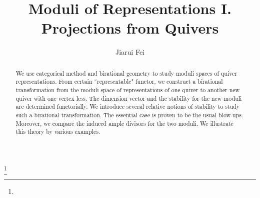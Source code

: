 \documentclass{amsart}
\theoremstyle{definition}
\theoremstyle{remark}
\numberwithin{equation}{section}
\begin{document}
\title{Moduli of Representations I. Projections from Quivers}

\author{Jiarui Fei}
\address{Department of Mathematics, University of Michigan, Ann Arbor, MI 48109, USA}
\thanks{}


\date{}
\dedicatory{}

\begin{abstract} We use categorical method and birational geometry to study moduli spaces of quiver representations. From certain ``representable" functor, we construct a birational transformation from the moduli space of representations of one quiver to another new quiver with one vertex less. The dimension vector and the stability for the new moduli are determined functorially. We introduce several relative notions of stability to study such a birational transformation. The essential case is proven to be the usual blow-ups. Moreover, we compare the induced ample divisors for the two moduli. We illustrate this theory by various examples.
\end{abstract}

\maketitle
\end{document}
